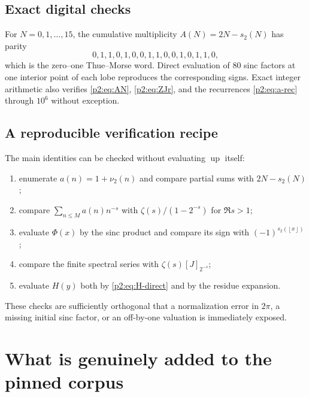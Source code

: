 \documentclass[11pt]{article}
\numberwithin{equation}{section}
\theoremstyle{definition}
\theoremstyle{remark}
\newcommand{\Up}{\operatorname{up}}
\newcommand{\floor}[1]{\left\lfloor#1\right\rfloor}
\begin{document}
\subsection{Exact digital checks}

For $N=0,1,\ldots,15$, the cumulative multiplicity
$A(N)=2N-s_2(N)$ has parity
\[
 0,1,1,0,1,0,0,1,1,0,0,1,0,1,1,0,
\]
which is the zero--one Thue--Morse word.  Direct evaluation of 80 sinc factors at
one interior point of each lobe reproduces the corresponding signs.  Exact
integer arithmetic also verifies \eqref{p2:eq:AN}, \eqref{p2:eq:ZJr}, and the
recurrences \eqref{p2:eq:a-rec} through $10^6$ without exception.

\subsection{A reproducible verification recipe}

The main identities can be checked without evaluating $\Up$ itself:
\begin{enumerate}
\item enumerate $a(n)=1+\nu_2(n)$ and compare partial sums with $2N-s_2(N)$;
\item compare $\sum_{n\le M}a(n)n^{-s}$ with
      $\zeta(s)/(1-2^{-s})$ for $\Re s>1$;
\item evaluate $\Phi(x)$ by the sinc product and compare its sign with
      $(-1)^{s_2(\floor x)}$;
\item compare the finite spectral series with $\zeta(s)[J]_{2^{-s}}$;
\item evaluate $H(y)$ both by \eqref{p2:eq:H-direct} and by the residue expansion.
\end{enumerate}
These checks are sufficiently orthogonal that a normalization error in $2\pi$,
a missing initial sinc factor, or an off-by-one valuation is immediately exposed.

\section{What is genuinely added to the pinned corpus}
\label{p2:sec:novelty}
\end{document}
